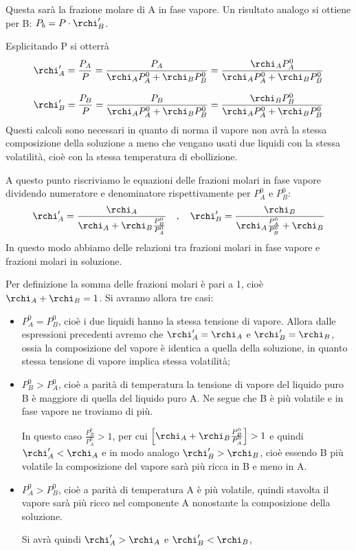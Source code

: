Questa sarà la frazione molare di A in fase vapore. Un risultato analogo si ottiene per B: $P_b=P \cdot \rchi '_B$.

Esplicitando P si otterrà
$$\rchi '_A=\frac{P_A}{P}=
\frac{P_A}{\rchi_A P_A^0 + \rchi_B P_B^0}=
\frac{\rchi_A P_A^0}{\rchi_A P_A^0 + \rchi_B P_B^0}$$

$$\rchi '_B=\frac{P_B}{P}=
\frac{P_B}{\rchi_A P_A^0 + \rchi_B P_B^0}=
\frac{\rchi_B P_B^0}{\rchi_A P_A^0 + \rchi_B P_B^0}$$
Questi calcoli sono necessari in quanto di norma il vapore non avrà la stessa composizione della soluzione a meno che vengano usati due liquidi con la stessa volatilità, cioè con la stessa temperatura di ebollizione.

A questo punto riscriviamo le equazioni delle frazioni molari in fase vapore dividendo numeratore e denominatore rispettivamente per $P_A^0$ e $P_B^0$:
$$\rchi'_A=\frac{\rchi_A}{\rchi_A + \rchi_B\frac{P^0_B}{P^0_A}}
\quad,\quad
\rchi'_B=\frac{\rchi_B}{\rchi_A\frac{P^0_A}{P^0_B} + \rchi_B}$$
In questo modo abbiamo delle relazioni tra frazioni molari in fase vapore e frazioni molari in soluzione.

Per definizione la somma delle frazioni molari è pari a 1, cioè $\rchi_A + \rchi_B =1$. Si avranno allora tre casi:
\begin{itemize}
    \item $P_A^0=P_B^0$, cioè i due liquidi hanno la stessa tensione di vapore. Allora dalle espressioni precedenti avremo che $\rchi_A'=\rchi_A$ e $\rchi_B'=\rchi_B$, ossia la composizione del vapore è identica a quella della soluzione, in quanto stessa tensione di vapore implica stessa volatilità;
    \item $P_B^0>P_A^0$, cioè a parità di temperatura la tensione di vapore del liquido puro B è maggiore di quella del liquido puro A. Ne segue che B è più volatile e in fase vapore ne troviamo di più.
    
    In questo caso $\frac{P_B^0}{P_A^0}>1$, per cui $\Big[\rchi_A + \rchi_B\frac{P_B^0}{P_A^0}\Big]>1$ e quindi $\rchi_A' < \rchi_A$ e in modo analogo $\rchi_B' > \rchi_B$, cioè essendo B più volatile la composizione del vapore sarà più ricca in B e meno in A.
    \item  $P_A^0>P_B^0$, cioè a parità di temperatura A è più volatile, quindi stavolta il vapore sarà più ricco nel componente A nonostante la composizione della soluzione.
    
    Si avrà quindi $\rchi_A' > \rchi_A$ e $\rchi_B' < \rchi_B$,
\end{itemize}


